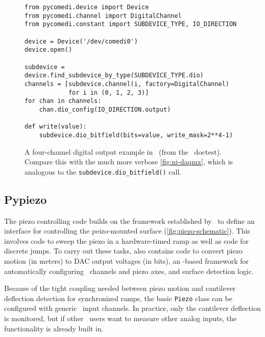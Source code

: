 \begin{figure}
  \begin{center}
\begin{verbatim}
from pycomedi.device import Device
from pycomedi.channel import DigitalChannel
from pycomedi.constant import SUBDEVICE_TYPE, IO_DIRECTION

device = Device('/dev/comedi0')
device.open()

subdevice = device.find_subdevice_by_type(SUBDEVICE_TYPE.dio)
channels = [subdevice.channel(i, factory=DigitalChannel)
            for i in (0, 1, 2, 3)]
for chan in channels:
    chan.dio_config(IO_DIRECTION.output)

def write(value):
    subdevice.dio_bitfield(bits=value, write_mask=2**4-1)
\end{verbatim}
    \caption{A four-channel digital output example in \pycomedi\ (from
      the \stepper\ doctest).  Compare this with the much more verbose
      \cref{fig:ni-daqmx}, which is analogous to the
      \texttt{subdevice.dio\_bitfield()} call.\label{fig:pycomedi}}
  \end{center}
\end{figure}

\subsection{Pypiezo}
\label{sec:pyafm:pypiezo}

The piezo controlling code builds on the framework established by
\pycomedi\ to define an interface for controlling the peizo-mounted
surface (\cref{fig:piezo-schematic}).  This involves code to sweep the
piezo in a hardware-timed ramp as well as code for discrete jumps.  To
carry out these tasks, \pypiezo also contains code to convert piezo
motion (in meters) to DAC output voltages (in bits), an
\hFconfig-based framework for automatically configuring
\pycomedi\ channels and piezo axes, and surface detection logic.

Because of the tight coupling needed between piezo motion and
cantilever deflection detection for synchronized ramps, the basic
\texttt{Piezo} class can be configured with generic \pycomedi\ input
channels.  In practice, only the cantilever deflection is monitored,
but if other \pypiezo\ users want to measure other analog inputs, the
functionality is already built in.
%

